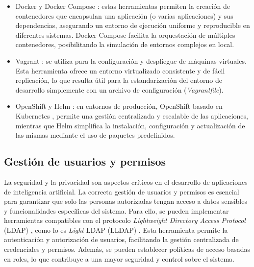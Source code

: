 \begin{itemize}
	\item Docker y Docker Compose \citep{merkel_docker_2014} \citep{docker_docker_0000}: estas herramientas permiten la creación de contenedores que encapsulan una aplicación (o varias aplicaciones) y sus dependencias, asegurando un entorno de ejecución uniforme y reproducible en diferentes sistemas. Docker Compose facilita la orquestación de múltiples contenedores, posibilitando la simulación de entornos complejos en local.
	\item Vagrant \citep{hashicorp_vagrant_2023} \citep{hashicorp_documentation_nodate}: se utiliza para la configuración y despliegue de máquinas virtuales. Esta herramienta ofrece un entorno virtualizado consistente y de fácil replicación, lo que resulta útil para la estandarización del entorno de desarrollo simplemente con un archivo de configuración (\textit{Vagrantfile}).
	\item OpenShift \citep{red_hat_openshift_2023} \citep{red_hat_red_nodate} y Helm \citep{the_helm_authors_helm_2023} \citep{the_helm_authors_docs_nodate}: en entornos de producción, OpenShift basado en Kubernetes \citep{wikipedia_kubernetes_2025}, permite una gestión centralizada y escalable de las aplicaciones, mientras que Helm simplifica la instalación, configuración y actualización de las mismas mediante el uso de paquetes predefinidos.
\end{itemize}

\subsection{Gestión de usuarios y permisos}

La seguridad y la privacidad son aspectos críticos en el desarrollo de aplicaciones de inteligencia artificial. La correcta gestión de usuarios y permisos es esencial para garantizar que solo las personas autorizadas tengan acceso a datos sensibles y funcionalidades específicas del sistema. Para ello, se pueden implementar herramientas compatibles con el protocolo \textit{Lightweight Directory Access Protocol} (LDAP) \citep{noauthor_protocolo_2024}, como lo es \textit{Light} LDAP (LLDAP) \citep{lldap_authors_lldap_2023}. Esta herramienta permite la autenticación y autorización de usuarios, facilitando la gestión centralizada de credenciales y permisos. Además, se pueden establecer políticas de acceso basadas en roles, lo que contribuye a una mayor seguridad y control sobre el sistema.

